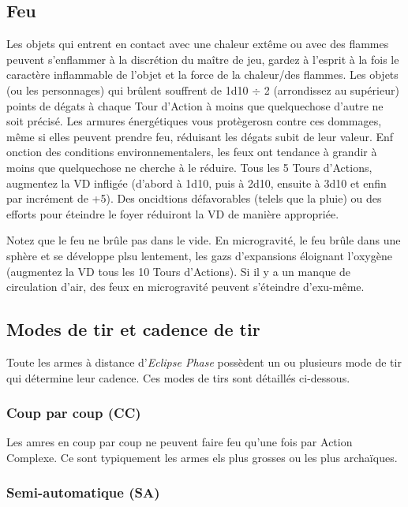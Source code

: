 \subsection{Feu} \label{sec:fire} 

Les objets qui entrent en contact avec une chaleur extême ou avec des flammes peuvent s'enflammer à la discrétion du maître de jeu, gardez à l'esprit à la fois le caractère inflammable de l'objet et la force de la chaleur/des flammes. Les objets (ou les personnages) qui brûlent souffrent de 1d10 $\div$ 2 (arrondissez au supérieur) points de dégats à chaque Tour d'Action à moins que quelquechose d'autre ne soit précisé. Les armures énergétiques vous protègerosn contre ces dommages, même si elles peuvent prendre feu, réduisant les dégats subit de leur valeur. Enf onction des conditions environnementalers, les feux ont tendance à grandir à moins que quelquechose ne cherche à le réduire. Tous les 5 Tours d'Actions, augmentez la VD infligée (d'abord à 1d10, puis à 2d10, ensuite à 3d10 et enfin par incrément de +5). Des oncidtions défavorables (telels que la pluie) ou des efforts pour éteindre le foyer réduiront la VD de manière appropriée. 

Notez que le feu ne brûle pas dans le vide. En microgravité, le feu brûle dans une sphère et se développe plsu lentement, les gazs d'expansions éloignant l'oxygène (augmentez la VD tous les 10 Tours d'Actions). Si il y a un manque de circulation d'air, des feux en microgravité peuvent s'éteindre d'exu-même. 



\subsection{Modes de tir et cadence de tir} \label{sec:firing-modes-rate} 

Toute les armes à distance d'\emph{Eclipse Phase} possèdent un ou plusieurs mode de tir qui détermine leur cadence. Ces modes de tirs sont détaillés ci-dessous. 

\subsubsection{Coup par coup (CC)} 

Les amres en coup par coup ne peuvent faire feu qu'une fois par Action Complexe. Ce sont typiquement les armes els plus grosses ou les plus archaïques. 

\subsubsection{Semi-automatique (SA)} 

